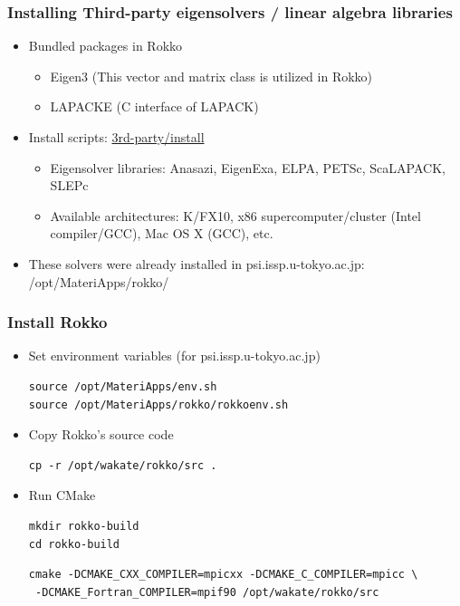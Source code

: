 \begin{frame}
  \frametitle{Installing Third-party eigensolvers / linear algebra libraries}
  \begin{itemize}
  \item Bundled packages in Rokko
    \begin{itemize}
    \item Eigen3 (This vector and matrix class is utilized in Rokko)
    \item LAPACKE (C interface of LAPACK)
    \end{itemize}
  \item Install scripts: \href{https://github.com/t-sakashita/rokko/tree/master/3rd-party/install}{3rd-party/install}
    \begin{itemize}
      \item Eigensolver libraries: Anasazi, EigenExa, ELPA, PETSc, ScaLAPACK, SLEPc
      \item Available architectures: K/FX10, x86 supercomputer/cluster (Intel compiler/GCC), Mac OS X (GCC), etc.
    \end{itemize}
  \item These solvers were already installed in psi.issp.u-tokyo.ac.jp:
/opt/MateriApps/rokko/
  \end{itemize}
\end{frame}

\begin{frame}[c,fragile]
  \frametitle{Install Rokko}
  \begin{itemize}
  \item Set environment variables (for psi.issp.u-tokyo.ac.jp)
\begin{lstlisting}[style=shstyle]
source /opt/MateriApps/env.sh
source /opt/MateriApps/rokko/rokkoenv.sh
\end{lstlisting}
  \item Copy Rokko's source code
\begin{lstlisting}[style=shstyle]
cp -r /opt/wakate/rokko/src .
\end{lstlisting}
  \item Run CMake
\begin{lstlisting}[style=shstyle]
mkdir rokko-build
cd rokko-build
\end{lstlisting}
\begin{lstlisting}[style=shstyle]
cmake -DCMAKE_CXX_COMPILER=mpicxx -DCMAKE_C_COMPILER=mpicc \
 -DCMAKE_Fortran_COMPILER=mpif90 /opt/wakate/rokko/src
\end{lstlisting}
  \end{itemize}
\end{frame}



